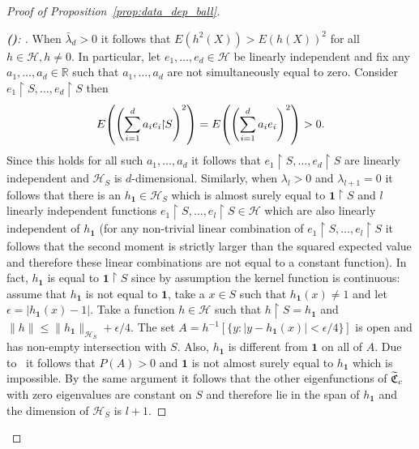\documentclass[10pt]{amsart}
\theoremstyle{definition}\newtheorem{defi}[theo]{Definition}\newtheorem{rema}[theo]{Remark}\newtheorem{exam}[theo]{Example}\newtheorem{exem}[theo]{Example}\newtheorem{nota}[theo]{Notation}
\theoremstyle{remark}
\newcommand{\restrr}
{\!\!\upharpoonright\!\!}
\newcommand{\R}{\mathbb{R}}
\newcommand{\cH}{\mathcal{H}}
\newcommand{\fkC}{\mathfrak{C}}
\let\oldtilde\tilde
\renewcommand*{\tilde}[1]{\mathchoice{\widetilde{#1}}{\widetilde{#1}}{\oldtilde{#1}}{\oldtilde{#1}}}
\let\originalleft\left
\let\originalright\right
\renewcommand{\left}{\mathopen{}\mathclose\bgroup\originalleft}
\renewcommand{\right}{\aftergroup\egroup\originalright}
\newcounter{setofstep}
\newcounter{step}[setofstep]
\newenvironment{step}[1][]{\refstepcounter{step}\begin{proof}[{\textbf{(\thestep)}\if#1\empty\else: #1\fi}]}{\let\qed\relax\end{proof}}
\newcommand{\newstepset}{\stepcounter{setofstep}}
\renewcommand{\thestep}{\alph{step}}
\newenvironment{proofc}[1][\proofname]{\begin{proof}[{#1}]}{\end{proof}}\AtBeginDocument{\special{pdf:mapfile +yhmath.map}}
\begin{document}
\begin{proofc}[{Proof of Proposition~\ref{prop:data_dep_ball}}]
\newstepset
\begin{step}\label{prfprop2.15stp1}
When $\bar\lambda_d >0$ it follows that $E(h^2(X)) > E(h(X))^2$ for all $h \in \cH, h \not = 0$. In particular, let $e_1,\dots, e_d \in \cH$ be linearly independent and fix any $a_1,\dots, a_d \in \R$ such that $a_1, \dots, a_d$ are not simultaneously equal to zero. Consider $e_1\restrr S, \dots, e_d\restrr S$ then
\[
E\left(\left(\sum_{i=1}^d a_i e_i\restrr S\right)^2 \right) = E\left(\left(\sum_{i=1}^d a_i e_i \right)^2 \right) > 0.
\]
Since this holds for all such $a_1,\dots, a_d$ it follows that $e_1\restrr S, \dots, e_d\restrr S$ are linearly independent and $\cH_S$ is $d$-dimensional. Similarly, when $\lambda_l > 0$ and $\lambda_{l+1} = 0$ it follows that there is an $h_{\bm 1} \in \cH_S$ which is almost surely equal to $\bm 1 \restrr S$ and $l$ linearly independent functions $e_1\restrr S,\dots, e_l\restrr S \in \cH$ which are also linearly independent of $h_{\bm 1}$ (for any non-trivial linear combination of $e_1\restrr S,\dots, e_l\restrr S$ it follows that the second moment is strictly larger than the squared expected value and therefore these linear combinations are not equal to a constant function). In fact, $h_{\bm 1}$ is equal to $\bm 1\restrr S$ since by assumption the kernel function is continuous: assume that $h_{\bm 1}$ is not equal to $\bm 1$, take a $x\in S$ such that $h_{\bm 1}(x) \not = 1$ and let $\epsilon = | h_{\bm 1}(x) - 1|$. Take a function $h\in \cH$ such that $h\restrr S = h_{\bm 1}$ and $\|h\| \leq \|h_{\bm 1}\|_{\cH_S} + \epsilon/4$. The set $A = h^{-1}[\{y: |y - h_{\bm 1}(x)| < \epsilon/4 \}]$ is open and has non-empty intersection with $S$. Also, $h_{\bm 1}$ is different from $\bm 1$ on all of $A$. Due to~\cite[411N]{FREM} it follows that $P(A)>0$ and $\bm 1$ is not almost surely equal to $h_{\bm 1}$ which is impossible. By the same argument it follows that the other eigenfunctions of $\tilde{\fkC}_c$ with zero eigenvalues are constant on $S$ and therefore lie in the span of $h_{\bm 1}$ and the dimension of $\cH_S$ is $l+1$.
\end{step}


\end{proofc}
\end{document}
